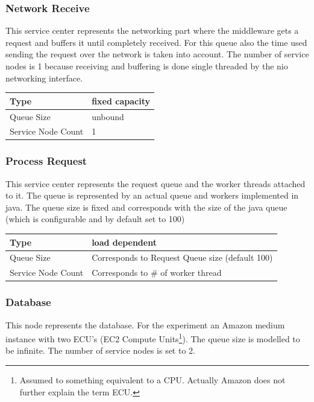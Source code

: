 \documentclass[a4paper]{article}
\begin{document}
\subsubsection{Network Receive}
\label{subsub:ServiceCenterNetworkReceive}

This service center represents the networking part where the middleware gets a request and buffers it until completely received. For this queue also the time used sending the request over the network is taken into account. The number of service nodes is 1 because receiving and buffering is done single threaded by the nio networking interface.\\

\begin{tabular}{|l|l|}
\hline 
Type & fixed capacity \\ 
\hline 
Queue Size & unbound\\ 
\hline 
Service Node Count & 1 \\ 
\hline 
\end{tabular} 

\subsubsection{Process Request}
This service center represents the request queue and the worker threads attached to it. The queue is represented by an actual queue and workers implemented in java. The queue size is fixed and corresponds with the size of the java queue (which is configurable and by default set to 100) \\

\begin{tabular}{|l|l|}
\hline 
Type & load dependent \\ 
\hline 
Queue Size & Corresponds to Request Queue size (default 100)\\ 
\hline 
Service Node Count & Corresponds to \# of worker thread \\ 
\hline 
\end{tabular} 

\subsubsection{Database}
This node represents the database. For the experiment an Amazon medium instance with two ECU's (EC2 Compute Units\footnote{Assumed to something equivalent to a CPU. Actually Amazon does not further explain the term ECU.}). The queue size is modelled to be infinite. The number of service nodes is set to 2.\\
\end{document}
